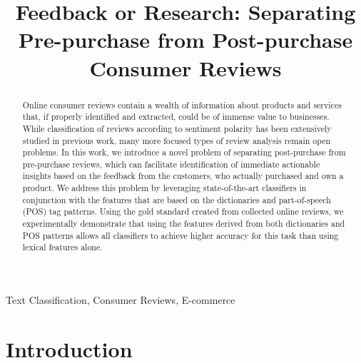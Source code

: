\documentclass[runningheads,a4paper]{llncs}
\newcommand{\keywords}[1]{\par\addvspace\baselineskip
\noindent\keywordname\enspace\ignorespaces#1}
\begin{document}
\mainmatter


\title{Feedback or Research: Separating Pre-purchase from Post-purchase Consumer Reviews}

\author{}


\institute{}

\maketitle

\begin{abstract}
Online consumer reviews contain a wealth of information about products and services that, if properly identified and extracted, could be of immense value to businesses. While
classification of reviews according to sentiment polarity has been extensively studied in previous work, many more focused types of review analysis remain open problems.
In this work, we introduce a novel problem of separating post-purchase from pre-purchase reviews, which can facilitate identification of immediate actionable insights
based on the feedback from the customers, who actually purchased and own a product. We address this problem by leveraging state-of-the-art classifiers in conjunction with the
features that are based on the dictionaries and part-of-speech (POS) tag patterns. Using the gold standard created from collected online reviews, we experimentally demonstrate
that using the features derived from both dictionaries and POS patterns allows all classifiers to achieve higher accuracy for this task than using lexical features alone.
\end{abstract}

\keywords{Text Classification, Consumer Reviews, E-commerce}

\section{Introduction}
\end{document}
